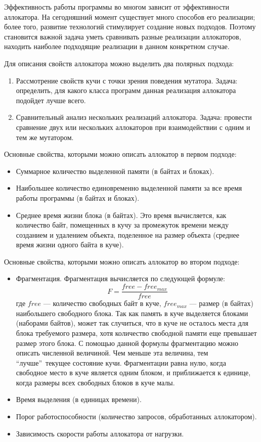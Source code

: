 \documentclass[12pt,a4paper]{article}
\begin{document}
   Эффективность работы программы во многом зависит от эффективности аллокатора. На сегодняшний момент существует много способов его 
   реализации; более того, развитие технологий стимулирует создание новых подходов. Поэтому становится важной задача уметь сравнивать разные
   реализации аллокаторов, находить наиболее подходящие реализации в данном конкретном случае.
   
   Для описания свойств аллокатора можно выделить два полярных подхода:
   \begin{enumerate}
   \item Рассмотрение свойств кучи с точки зрения поведения мутатора. Задача: определить, для какого класса программ данная реализация аллокатора 
   подойдет лучше всего. 
   \item Сравнительный анализ нескольких реализаций аллокатора. Задача: провести сравнение двух или нескольких аллокаторов при взаимодействии с
   одним и тем же мутатором.
   \end{enumerate}
   
   Основные свойства, которыми можно описать аллокатор в первом подходе:
   \begin{itemize}
   \item Суммарное количество выделенной памяти (в байтах и блоках).
   \item Наибольшее количество единовременно выделенной памяти за все время работы программы (в байтах и блоках).
   \item Среднее время жизни блока (в байтах). Это время вычисляется, как количество байт, помещенных в кучу за промежуток времени между 
   созданием и удалением объекта, поделенное на размер объекта (среднее время жизни одного байта в куче).
   \end{itemize}
   
   Основные свойства, которыми можно описать аллокатор во втором подходе:
   \begin{itemize}
   \item Фрагментация. Фрагментация вычисляется по следующей формуле: \[ F = \frac{free - free_{max}}{free} \]
   где $free$ --- количество свободных байт в куче, $free_{max}$ --- размер (в байтах) наибольшего свободного блока.  Так как память в куче выделяется
   блоками (наборами байтов), может так случиться, что в куче не осталось места для блока требуемого размера, хотя количество свободной 
   памяти еще превышает размер этого блока. С помощью данной формулы фрагментацию можно описать численной величиной. Чем меньше эта
   величина, тем \textquotedblleft лучше\textquotedblright~текущее состояние кучи. Фрагментации равна нулю, когда свободное место в 
   куче является одним блоком, и приближается к единице, когда размеры всех свободных блоков в куче малы. 
   \item Время выделения (в единицах времени).
   \item Порог работоспособности (количество запросов, обработанных аллокатором).
   \item Зависимость скорости работы аллокатора от нагрузки.
   \end{itemize}
    
\end{document}
